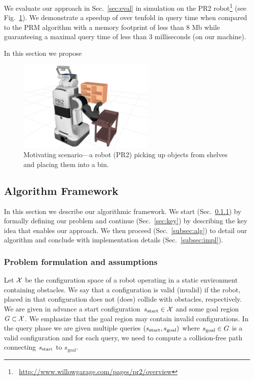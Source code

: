 \documentclass[a4paper,10pt]{article}
\begin{document}
We evaluate our approach in Sec.~\ref{sec:eval} in simulation on the PR2 robot\footnote{~\url{http://www.willowgarage.com/pages/pr2/overview}} (see Fig.~\ref{fig:PR2}).
We demonstrate a speedup of over tenfold in query time when compared to the PRM algorithm with a memory footprint of less than 8 Mb while guaranteeing a maximal query time of less than 3 milliseconds (on our machine).


In this section we propose 
\begin{figure}[tb]
  \centering
    \includegraphics[width=0.6\textwidth]{pr2.png}
  \caption{
  Motivating scenario---a robot (PR2) picking up objects from shelves and placing them into a bin.
}
    \label{fig:PR2}
\end{figure}

\subsection{Algorithm Framework}
\label{sec:alg}
In this section we describe our algorithmic framework. We start (Sec.~\ref{sec:pdef}) by formally defining our problem and continue (Sec.~\ref{sec:key}) by describing the key idea that enables our approach.
We then proceed (Sec.~\ref{subsec:alg}) to detail our algorithm and conclude with implementation details (Sec.~\ref{subsec:impl}).

\subsubsection{Problem formulation and assumptions}
\label{sec:pdef}
Let $\mathcal{X}$ be the configuration space of a robot operating in a static environment containing obstacles.
We say that a configuration is valid (invalid) if the robot, placed in that configuration does not (does) collide with obstacles, respectively.
We are given in advance a start configuration~$s_{\textrm{start}} \in \mathcal{X}$ and some goal region~$G \subset \mathcal{X}$.
We emphasize that the goal region may contain invalid configurations.
In the query phase we are given multiple queries $(s_{\textrm{start}}, s_{\text{goal}})$ where $s_{\rm goal} \in G$ is a valid configuration and for each query, we need to compute a collision-free path connecting $s_{\textrm{start}}$ to $s_{\text{goal}}$.
\end{document}
